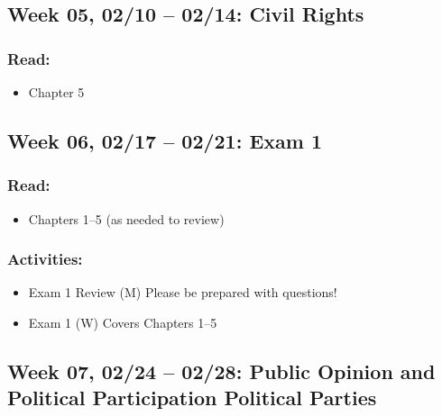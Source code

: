 \documentclass[11pt,]{article}
\providecommand{\tightlist}{%
  \setlength{\itemsep}{0pt}\setlength{\parskip}{0pt}}
\begin{document}
\hypertarget{week-05-0210-0214-civil-rights}{%
\subsection{Week 05, 02/10 -- 02/14: Civil
Rights}\label{week-05-0210-0214-civil-rights}}

\hypertarget{read-4}{%
\subsubsection{Read:}\label{read-4}}

\begin{itemize}
\tightlist
\item
  Chapter 5
\end{itemize}

\hypertarget{week-06-0217-0221-exam-1}{%
\subsection{Week 06, 02/17 -- 02/21: Exam
1}\label{week-06-0217-0221-exam-1}}

\hypertarget{read-5}{%
\subsubsection{Read:}\label{read-5}}

\begin{itemize}
\tightlist
\item
  Chapters 1--5 (as needed to review)
\end{itemize}

\hypertarget{activities}{%
\subsubsection{Activities:}\label{activities}}

\begin{itemize}
\item
  Exam 1 Review (M) \textbar{} Please be prepared with questions!
\item
  Exam 1 (W) \textbar{} Covers Chapters 1--5
\end{itemize}

\hypertarget{week-07-0224-0228-public-opinion-and-political-participation-political-parties}{%
\subsection{Week 07, 02/24 -- 02/28: Public Opinion and Political
Participation \textbar{} Political
Parties}\label{week-07-0224-0228-public-opinion-and-political-participation-political-parties}}
\end{document}
